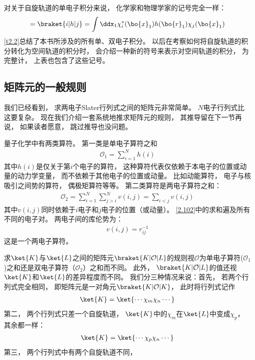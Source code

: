 对关于自旋轨道的单电子积分来说，
化学家和物理学家的记号完全一样：
\begin{align}
[i|h|j]=\braket{i|h|j}=\int\ddx_1\chi_i^*(\bo{x}_1)h(\bo{r}_1)\chi_j(\bo{x}_1)
\end{align}
\autoref{t2.2}总结了本书所涉及的所有单、双电子积分。
以后在考察如何将自旋轨道的积分转化为空间轨道的积分时，
会介绍一种新的符号来表示对空间轨道的积分，
为完整计，
上表也包含了这些记号。



\subsection{矩阵元的一般规则}
\label{sec2.3.3}
我们已经看到，
求两电子Slater行列式之间的矩阵元非常简单。
$N$电子行列式比这要复杂。
现在我们介绍一套系统地推求矩阵元的规则，
其推导留在下一节再说，
如果读者愿意，
跳过推导也没问题。


量子化学中有两类算符。
第一类是单电子算符之和
\begin{align}
\mathcal{O}_1=\sum_{i=1}^N h(i)
\end{align}
其中$h(i)$是仅关于第$i$个电子的算符，
这种算符代表仅依赖于本电子的位置或动量的动力学变量，
而不依赖于其他电子的位置或动量。
比如动能算符，
电子与核吸引之间势的算符，
偶极矩算符等等。
第二类算符是两电子算符之和：
\begin{align}
\label{2.102}
\mathcal{O}_2 = \sum_{i=1}^{N}\sum_{j>i}^N v(i,j)=\sum_{i<j}v(i,j)
\end{align}
其中$v(i,j)$同时依赖于$i$电子和$j$电子的位置（或动量）。
\autoref{2.102}中的求和遍及所有不同的电子对。
两电子间的库伦势为：
\begin{align}
v(i,j)=r_{ij}^{-1}
\end{align}
这是一个两电子算符。


求$\ket{K}$与$\ket{L}$之间的矩阵元$\braket{K|\mathcal{O}|L}$的规则视$\mathcal{O}$为单电子算符($\mathcal{O}_1$)之和还是双电子算符（$\mathcal{O}_2$）之和而不同。
此外，
$\braket{K|\mathcal{O}|L}$的值还视$\ket{K}$和$\ket{L}$的差异程度而不同。
我们分三种情况来说：首先，
若两个行列式完全相同，
即矩阵元是一对角元$\braket{K|\mathcal{O}|K}$，
此时将行列式记作
\begin{align}
\ket{K}=\ket{\cdots\chi_m\chi_n\cdots}
\end{align}
第二，
两个行列式只差一个自旋轨道，
$\ket{K}$中的$\chi_m$在$\ket{L}$中变成$\chi_p$，
其余都一样：
\begin{align}
\ket{K}=\ket{\cdots\chi_p\chi_n\cdots}
\end{align}
第三，
两个行列式中有两个自旋轨道不同，

